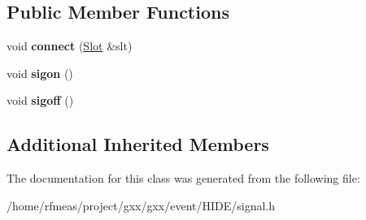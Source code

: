 \subsection*{Public Member Functions}
\begin{DoxyCompactItemize}
\item 
void {\bfseries connect} (\hyperlink{classgxx_1_1basic__slot}{Slot} \&slt)\hypertarget{classgxx_1_1sigflag_adfea426da5c1bb7f16814d32f1aa313c}{}\label{classgxx_1_1sigflag_adfea426da5c1bb7f16814d32f1aa313c}

\item 
void {\bfseries sigon} ()\hypertarget{classgxx_1_1sigflag_a161b6f4f752248483ba2be9e1f94d905}{}\label{classgxx_1_1sigflag_a161b6f4f752248483ba2be9e1f94d905}

\item 
void {\bfseries sigoff} ()\hypertarget{classgxx_1_1sigflag_a284388c1bb43a3a7e184fbc64552f268}{}\label{classgxx_1_1sigflag_a284388c1bb43a3a7e184fbc64552f268}

\end{DoxyCompactItemize}
\subsection*{Additional Inherited Members}


The documentation for this class was generated from the following file\+:\begin{DoxyCompactItemize}
\item 
/home/rfmeas/project/gxx/gxx/event/\+H\+I\+D\+E/signal.\+h\end{DoxyCompactItemize}
